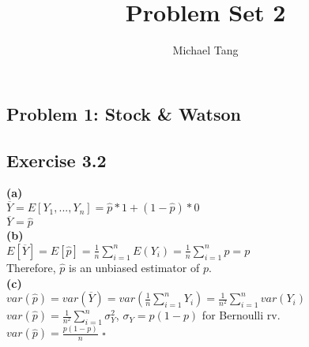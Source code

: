 \documentclass{article}
\title{Problem Set 2}
\author{Michael Tang}
\begin{document}
\maketitle
{}
\begin{adjustwidth}{-2cm}{-2cm}

\section{Problem 1: Stock \& Watson}
\subsection{Exercise 3.2}
\textbf{(a)}\\
$\overline{Y} = E\left[Y_{1},...,Y_{n}\right] = \hat{p}*1 + \left(1-\hat{p}\right)*0$\\
$\overline{Y} = \hat{p}$\\
\textbf{(b)}\\
$E\left[\overline{Y}\right] = E\left[\hat{p}\right] = \frac{1}{n}\sum_{i=1}^{n}E\left(Y_{i}\right) = \frac{1}{n}\sum_{i=1}^{n}p = p$\\
Therefore, $\hat{p}$ is an unbiased estimator of $p$.\\
\textbf{(c)}\\
$var\left(\hat{p}\right) = var\left(\overline{Y}\right) = var\left(\frac{1}{n}\sum_{i=1}^{n}Y_{i}\right) = \frac{1}{n^{2}}\sum_{i=1}^{n}var\left(Y_{i}\right)$\\
$var\left(\hat{p}\right) = \frac{1}{n^{2}}\sum_{i=1}^{n}\sigma_{Y}^2$, $\sigma_{Y} = p\left(1-p\right)$ for Bernoulli rv.\\
$var\left(\hat{p}\right) = \frac{p\left(1-p\right)}{n}$  $\square$

\end{adjustwidth}
\end{document}
